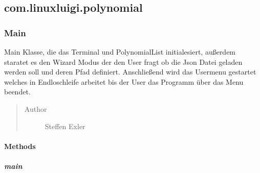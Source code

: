 \documentclass[letterpaper,10pt,ngerman]{sphinxmanual}
\begin{document}
\subsection{com.linuxluigi.polynomial}
\label{com/linuxluigi/polynomial/package-index:package-com.linuxluigi.polynomial}\label{com/linuxluigi/polynomial/package-index:com-linuxluigi-polynomial}\label{com/linuxluigi/polynomial/package-index::doc}

\subsubsection{Main}
\label{com/linuxluigi/polynomial/Main:main}\label{com/linuxluigi/polynomial/Main::doc}

\begin{fulllineitems}
\label{com/linuxluigi/polynomial/Main:com.linuxluigi.polynomial.Main}
Main Klasse, die das Terminal und PolynomialList initialesiert, außerdem staratet es den Wizard Modus der den User fragt ob die Json Datei geladen werden soll und deren Pfad definiert. Anschließend wird das Usermenu gestartet welches in Endloschleife arbeitet bis der User das Programm über das Menu beendet.
\begin{quote}\begin{description}
\item[{Author}] \leavevmode
Steffen Exler

\end{description}\end{quote}

\end{fulllineitems}



\paragraph{Methods}
\label{com/linuxluigi/polynomial/Main:methods}

\subparagraph{main}
\label{com/linuxluigi/polynomial/Main:id1}
\end{document}
